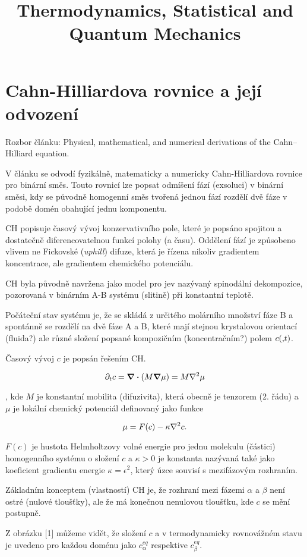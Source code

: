 \documentclass[a4]{article}
\title{Thermodynamics, Statistical and Quantum Mechanics}
\begin{document}
\section{Cahn-Hilliardova rovnice a její odvození}

Rozbor článku: Physical, mathematical, and numerical derivations of the Cahn–Hilliard
equation.

V článku se odvodí fyzikálně, matematicky a numericky Cahn-Hilliardova rovnice pro binární směs.
Touto rovnicí lze popsat odmíšení fází (exsoluci) v binární směsi, kdy se původně homogenní směs
tvořená jednou fází rozdělí dvě fáze v podobě domén obahující jednu komponentu.

CH popisuje časový vývoj konzervativního pole, které je popsáno spojitou a dostatečně diferencovatelnou funkcí polohy (a času).
Oddělení fází je způsobeno vlivem ne Fickovské (\textit{uphill}) difuze, která je řízena nikoliv gradientem koncentrace, ale  gradientem chemického potenciálu.

CH byla původně navržena jako model pro jev nazývaný spinodální dekompozice, pozorovaná v binárním A-B systému (slitině) při konstantní teplotě. 

Počáteční stav systému je, že se skládá z určitého molárního množství fáze B a spontánně se rozdělí na 
dvě fáze A a B, které mají stejnou krystalovou orientací (fluida?) ale různé složení popsané 
kompozičním (koncentračním?) polem $c(\vb, t)$.

Časový vývoj $c$ je popsán řešením CH.

$$
\partial_t c = \div(M \grad{\mu}) = M \laplacian{\mu}
$$

, kde $M$ je konstantní mobilita (difuzivita), která obecně je tenzorem (2. řádu) a 
$\mu$ je lokální chemický potenciál definovaný jako funkce

$$
    \mu = F(c) - \kappa \laplacian{c}.
$$

$F(c)$ je hustota Helmholtzovy volné energie pro jednu molekulu (částici) homogenního systému
o složení $c$ a $\kappa > 0$ je konstanta nazývaná také jako koeficient gradientu energie $\kappa = \epsilon^2$, který úzce souvisí s mezifázovým rozhraním.

Základním konceptem (vlastností) CH je, že rozhraní mezi fázemi $\alpha$ a $\beta$ není ostré (nulové tloušťky), ale že má konečnou nenulovou tloušťku, kde $c$ se mění postupně.

Z obrázku [1] můžeme vidět, že složení $c$ a v termodynamicky rovnovážném stavu je uvedeno pro každou doménu jako $c^{eq}_{\alpha}$ respektive $c^{eq}_{\beta}$.
\end{document}
